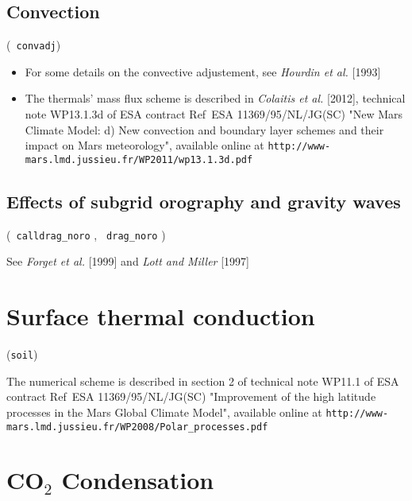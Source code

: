 \subsection{Convection}
 (\verb+ convadj+)
\begin{itemize}
\item For some details on the convective adjustement,
see {\it Hourdin et al.} [1993]
\item The thermals' mass flux scheme is described in
{\it Colaitis et al.} [2012],
technical note WP13.1.3d of ESA contract
Ref~ESA 11369/95/NL/JG(SC) "New Mars Climate Model:
d) New convection and boundary layer schemes and their impact on
Mars meteorology", available online at 
\verb+http://www-mars.lmd.jussieu.fr/WP2011/wp13.1.3d.pdf+
\end{itemize}
\nocite{Hour:93}
 
\subsection{Effects of subgrid orography and gravity waves}
 (\verb+ calldrag_noro+ ,  \verb+ drag_noro+ )

See {\it Forget et al. } [1999] and {\it Lott and Miller} [1997]
\nocite{Lott:97}

\section{Surface thermal conduction}
 (\verb+soil+)

The numerical scheme is described in section 2 of technical note
WP11.1 of ESA contract
Ref~ESA 11369/95/NL/JG(SC) "Improvement of the high latitude
processes in the Mars Global Climate Model", available online at
\verb+http://www-mars.lmd.jussieu.fr/WP2008/Polar_processes.pdf+
 
\section{CO$_2$ Condensation}

